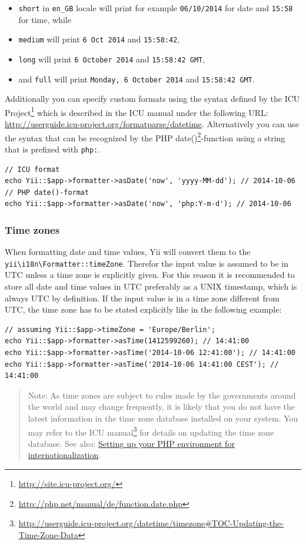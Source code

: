 \begin{itemize}
\item \lstinline|short| in \lstinline|en_GB| locale will print for example \lstinline|06/10/2014| for date and \lstinline|15:58| for time, while
\item \lstinline|medium| will print \lstinline|6 Oct 2014| and \lstinline|15:58:42|,
\item \lstinline|long| will print \lstinline|6 October 2014| and \lstinline|15:58:42 GMT|,
\item and \lstinline|full| will print \lstinline|Monday, 6 October 2014| and \lstinline|15:58:42 GMT|.
\end{itemize}
Additionally you can specify custom formats using the syntax defined by the
ICU Project\footnote{\url{http://site.icu-project.org/}} which is described in the ICU manual under the following URL:
\url{http://userguide.icu-project.org/formatparse/datetime}. Alternatively you can use the syntax that can be recognized by the
PHP date()\footnote{\url{http://php.net/manual/de/function.date.php}}-function using a string that is prefixed with \lstinline|php:|.

\lstset{language=php}\begin{lstlisting}
// ICU format
echo Yii::$app->formatter->asDate('now', 'yyyy-MM-dd'); // 2014-10-06
// PHP date()-format
echo Yii::$app->formatter->asDate('now', 'php:Y-m-d'); // 2014-10-06
\end{lstlisting}
\subsubsection{Time zones \label{output-formatter.md::time-zones}}
When formatting date and time values, Yii will convert them to the \texttt{yii{\allowbreak{}\textbackslash}i18n{\allowbreak{}\textbackslash}Formatter\allowbreak{}::\allowbreak{}timeZone}.
Therefor the input value is assumed to be in UTC unless a time zone is explicitly given. For this reason
it is recommended to store all date and time values in UTC preferably as a UNIX timestamp, which is always UTC by definition.
If the input value is in a time zone different from UTC, the time zone has to be stated explicitly like in the following example:

\lstset{language=php}\begin{lstlisting}
// assuming Yii::$app->timeZone = 'Europe/Berlin';
echo Yii::$app->formatter->asTime(1412599260); // 14:41:00
echo Yii::$app->formatter->asTime('2014-10-06 12:41:00'); // 14:41:00
echo Yii::$app->formatter->asTime('2014-10-06 14:41:00 CEST'); // 14:41:00
\end{lstlisting}
\begin{quote}Note: As time zones are subject to rules made by the governments around the world and may change frequently, it is
likely that you do not have the latest information in the time zone database installed on your system.
You may refer to the ICU manual\footnote{\url{http://userguide.icu-project.org/datetime/timezone\#TOC-Updating-the-Time-Zone-Data}}
for details on updating the time zone database.
See also: \hyperref[tutorial-i18n.md::setup-environment]{Setting up your PHP environment for internationalization}.

\end{quote}
